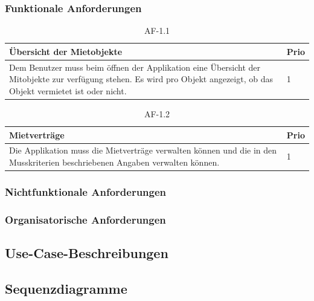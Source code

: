 \subsubsection{Funktionale Anforderungen}
\begin{table}[h]
  \centering
  \settowidth{}
  \setlength\extrarowheight{2pt}
  \begin{tabulary}{1.0\textwidth}{|L|L|}
    \hline
    \textbf{Übersicht der Mietobjekte}&\textbf{Prio}\\
    \hline
    Dem Benutzer muss beim öffnen der Applikation eine Übersicht der Mitobjekte zur verfügung stehen. Es wird pro Objekt angezeigt, ob das Objekt vermietet ist oder nicht. & 1\\ 
    \hline
  \end{tabulary}
  \caption{AF-1.1}
  \label{af1.1}
\end{table}

\begin{table}[h]
  \centering
  \settowidth{}
  \setlength\extrarowheight{2pt}
  \begin{tabulary}{1.0\textwidth}{|L|L|}
    \hline
    \textbf{Mietverträge}&\textbf{Prio}\\
    \hline
    Die Applikation muss die Mietverträge verwalten können und die in den Musskriterien beschriebenen Angaben verwalten können. & 1\\ 
    \hline
  \end{tabulary}
  \caption{AF-1.2}
  \label{af12}
\end{table}

\subsubsection{Nichtfunktionale Anforderungen}
\subsubsection{Organisatorische Anforderungen}

\subsection{Use-Case-Beschreibungen}
\subsection{Sequenzdiagramme}
